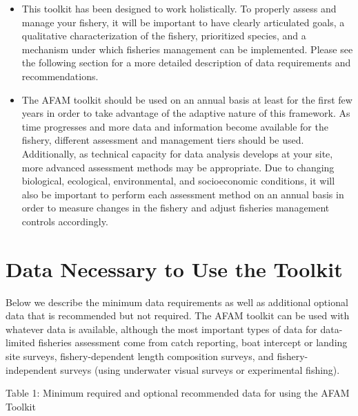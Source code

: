 \documentclass[]{book}
\begin{document}
\begin{itemize}
\item
  This toolkit has been designed to work holistically. To properly
  assess and manage your fishery, it will be important to have clearly
  articulated goals, a qualitative characterization of the fishery,
  prioritized species, and a mechanism under which fisheries management
  can be implemented. Please see the following section for a more
  detailed description of data requirements and recommendations.
\item
  The AFAM toolkit should be used on an annual basis at least for the
  first few years in order to take advantage of the adaptive nature of
  this framework. As time progresses and more data and information
  become available for the fishery, different assessment and management
  tiers should be used. Additionally, as technical capacity for data
  analysis develops at your site, more advanced assessment methods may
  be appropriate. Due to changing biological, ecological, environmental,
  and socioeconomic conditions, it will also be important to perform
  each assessment method on an annual basis in order to measure changes
  in the fishery and adjust fisheries management controls accordingly.
\end{itemize}

\section{Data Necessary to Use the
Toolkit}\label{data-necessary-to-use-the-toolkit}

Below we describe the minimum data requirements as well as additional
optional data that is recommended but not required. The AFAM toolkit can
be used with whatever data is available, although the most important
types of data for data-limited fisheries assessment come from catch
reporting, boat intercept or landing site surveys, fishery-dependent
length composition surveys, and fishery-independent surveys (using
underwater visual surveys or experimental fishing).

Table 1: Minimum required and optional recommended data for using the
AFAM Toolkit
\end{document}
